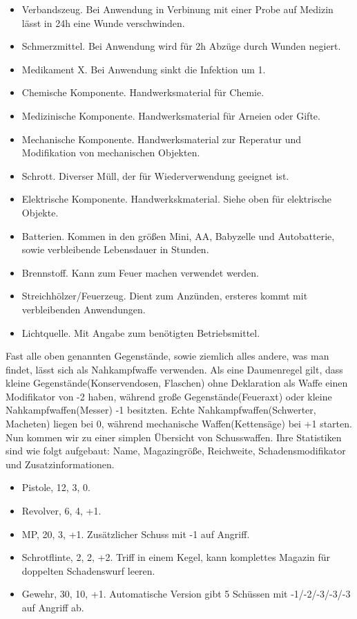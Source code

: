 \documentclass[twoside,a4paper]{minimal}
\begin{document}
\begin{multicols*}{3}
\begin{itemize}
\item Verbandszeug. Bei Anwendung in Verbinung mit einer Probe auf Medizin lässt in 24h eine Wunde verschwinden.
\item Schmerzmittel. Bei Anwendung wird für 2h Abzüge durch Wunden negiert.
\item Medikament X. Bei Anwendung sinkt die Infektion um 1.
\item Chemische Komponente. Handwerksmaterial für Chemie.
\item Medizinische Komponente. Handwerksmaterial für Arneien oder Gifte.
\item Mechanische Komponente. Handwerksmaterial zur Reperatur und Modifikation von mechanischen Objekten.
\item Schrott. Diverser Müll, der für Wiederverwendung geeignet ist.
\item Elektrische Komponente. Handwerkskmaterial. Siehe oben für elektrische Objekte.
\item Batterien. Kommen in den größen Mini, AA, Babyzelle und Autobatterie, sowie verbleibende Lebensdauer in Stunden.
\item Brennstoff. Kann zum Feuer machen verwendet werden.
\item Streichhölzer/Feuerzeug. Dient zum Anzünden, ersteres kommt mit verbleibenden Anwendungen.
\item Lichtquelle. Mit Angabe zum benötigten Betriebsmittel.
\end{itemize}
Fast alle oben genannten Gegenstände, sowie ziemlich alles andere, was man findet, lässt sich als Nahkampfwaffe verwenden. Als eine Daumenregel gilt, dass kleine Gegenstände(Konservendosen, Flaschen) ohne Deklaration als Waffe einen Modifikator von -2 haben, während große Gegenstände(Feueraxt) oder kleine Nahkampfwaffen(Messer) -1 besitzten. Echte Nahkampfwaffen(Schwerter, Macheten) liegen bei 0, während mechanische Waffen(Kettensäge) bei +1 starten.
Nun kommen wir zu einer simplen Übersicht von Schusswaffen. Ihre Statistiken sind wie folgt aufgebaut: Name, Magazingröße, Reichweite, Schadensmodifikator und Zusatzinformationen.
\begin{itemize}
\item Pistole, 12, 3, 0.
\item Revolver, 6, 4, +1.
\item MP, 20, 3, +1. Zusätzlicher Schuss mit -1 auf Angriff. 
\item Schrotflinte, 2, 2, +2. Triff in einem Kegel, kann komplettes Magazin für doppelten Schadenswurf leeren.
\item Gewehr, 30, 10, +1. Automatische Version gibt 5 Schüssen mit -1/-2/-3/-3/-3 auf Angriff ab.

\end{itemize}
\end{multicols*}
\end{document}
